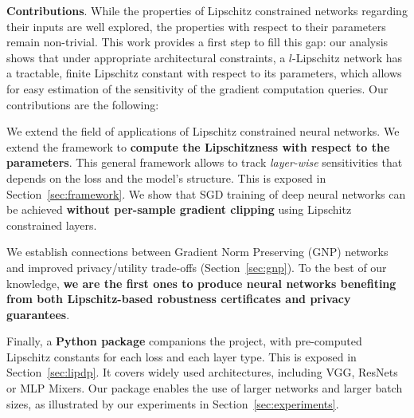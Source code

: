 \textbf{Contributions}.  While the properties of Lipschitz constrained networks regarding their inputs are well explored, the properties with respect to their parameters remain non-trivial. This work provides a first step to fill this gap: our analysis shows that under appropriate architectural constraints, a $l$-Lipschitz network has a tractable, finite Lipschitz constant with respect to its parameters, which allows for easy estimation of the sensitivity of the gradient computation queries. Our contributions are the following:
    \begin{compactenum} 
        \item We extend the field of applications of Lipschitz constrained neural networks. We extend the framework to \textbf{compute the Lipschitzness with respect to the parameters}. This general framework allows to track \textit{layer-wise} sensitivities that depends on the loss and the model's structure. This is exposed in Section~\ref{sec:framework}. We show that SGD training of deep neural networks can be achieved \textbf{without per-sample gradient clipping} using Lipschitz constrained layers.
        \item We establish connections  between Gradient Norm Preserving (GNP) networks and improved privacy/utility trade-offs (Section~\ref{sec:gnp}). To the best of our knowledge, \textbf{we are the first ones to produce neural networks benefiting from both Lipschitz-based robustness certificates and privacy guarantees}.
        \item Finally, a \textbf{Python package} companions the project, with pre-computed Lipschitz constants for each loss and each layer type. This is exposed in Section~\ref{sec:lipdp}. It covers widely used architectures, including VGG, ResNets or MLP Mixers. Our package enables the use of larger networks and larger batch sizes, as illustrated by our experiments in Section~\ref{sec:experiments}.
    \end{compactenum}
    